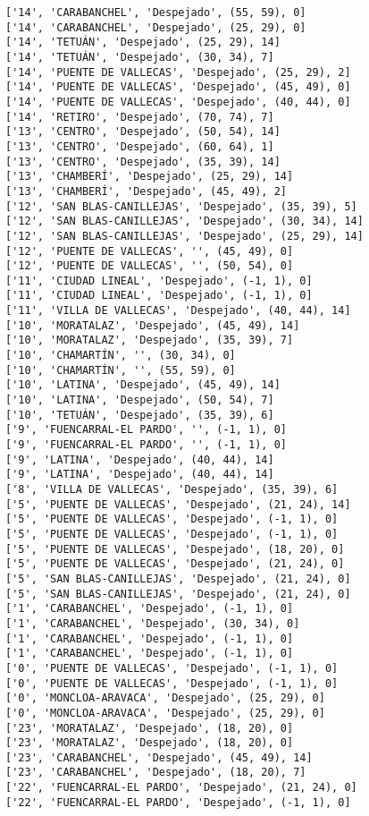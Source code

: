\documentclass[11pt]{article}
\begin{document}
\begin{Verbatim}[commandchars=\\\{\}]
['14', 'CARABANCHEL', 'Despejado', (55, 59), 0]
['14', 'CARABANCHEL', 'Despejado', (25, 29), 0]
['14', 'TETUÁN', 'Despejado', (25, 29), 14]
['14', 'TETUÁN', 'Despejado', (30, 34), 7]
['14', 'PUENTE DE VALLECAS', 'Despejado', (25, 29), 2]
['14', 'PUENTE DE VALLECAS', 'Despejado', (45, 49), 0]
['14', 'PUENTE DE VALLECAS', 'Despejado', (40, 44), 0]
['14', 'RETIRO', 'Despejado', (70, 74), 7]
['13', 'CENTRO', 'Despejado', (50, 54), 14]
['13', 'CENTRO', 'Despejado', (60, 64), 1]
['13', 'CENTRO', 'Despejado', (35, 39), 14]
['13', 'CHAMBERÍ', 'Despejado', (25, 29), 14]
['13', 'CHAMBERÍ', 'Despejado', (45, 49), 2]
['12', 'SAN BLAS-CANILLEJAS', 'Despejado', (35, 39), 5]
['12', 'SAN BLAS-CANILLEJAS', 'Despejado', (30, 34), 14]
['12', 'SAN BLAS-CANILLEJAS', 'Despejado', (25, 29), 14]
['12', 'PUENTE DE VALLECAS', '', (45, 49), 0]
['12', 'PUENTE DE VALLECAS', '', (50, 54), 0]
['11', 'CIUDAD LINEAL', 'Despejado', (-1, 1), 0]
['11', 'CIUDAD LINEAL', 'Despejado', (-1, 1), 0]
['11', 'VILLA DE VALLECAS', 'Despejado', (40, 44), 14]
['10', 'MORATALAZ', 'Despejado', (45, 49), 14]
['10', 'MORATALAZ', 'Despejado', (35, 39), 7]
['10', 'CHAMARTÍN', '', (30, 34), 0]
['10', 'CHAMARTÍN', '', (55, 59), 0]
['10', 'LATINA', 'Despejado', (45, 49), 14]
['10', 'LATINA', 'Despejado', (50, 54), 7]
['10', 'TETUÁN', 'Despejado', (35, 39), 6]
['9', 'FUENCARRAL-EL PARDO', '', (-1, 1), 0]
['9', 'FUENCARRAL-EL PARDO', '', (-1, 1), 0]
['9', 'LATINA', 'Despejado', (40, 44), 14]
['9', 'LATINA', 'Despejado', (40, 44), 14]
['8', 'VILLA DE VALLECAS', 'Despejado', (35, 39), 6]
['5', 'PUENTE DE VALLECAS', 'Despejado', (21, 24), 14]
['5', 'PUENTE DE VALLECAS', 'Despejado', (-1, 1), 0]
['5', 'PUENTE DE VALLECAS', 'Despejado', (-1, 1), 0]
['5', 'PUENTE DE VALLECAS', 'Despejado', (18, 20), 0]
['5', 'PUENTE DE VALLECAS', 'Despejado', (21, 24), 0]
['5', 'SAN BLAS-CANILLEJAS', 'Despejado', (21, 24), 0]
['5', 'SAN BLAS-CANILLEJAS', 'Despejado', (21, 24), 0]
['1', 'CARABANCHEL', 'Despejado', (-1, 1), 0]
['1', 'CARABANCHEL', 'Despejado', (30, 34), 0]
['1', 'CARABANCHEL', 'Despejado', (-1, 1), 0]
['1', 'CARABANCHEL', 'Despejado', (-1, 1), 0]
['0', 'PUENTE DE VALLECAS', 'Despejado', (-1, 1), 0]
['0', 'PUENTE DE VALLECAS', 'Despejado', (-1, 1), 0]
['0', 'MONCLOA-ARAVACA', 'Despejado', (25, 29), 0]
['0', 'MONCLOA-ARAVACA', 'Despejado', (25, 29), 0]
['23', 'MORATALAZ', 'Despejado', (18, 20), 0]
['23', 'MORATALAZ', 'Despejado', (18, 20), 0]
['23', 'CARABANCHEL', 'Despejado', (45, 49), 14]
['23', 'CARABANCHEL', 'Despejado', (18, 20), 7]
['22', 'FUENCARRAL-EL PARDO', 'Despejado', (21, 24), 0]
['22', 'FUENCARRAL-EL PARDO', 'Despejado', (-1, 1), 0]

\end{Verbatim}
\end{document}
